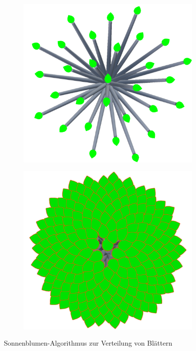 \setlength{\fwidth}{.49\textwidth}
\begin{figure}[htb]
  \centering
  \begin{subfigure}[b]{\fwidth}
   \includegraphics[width=\textwidth]{figures/sunflower-30_2}
    \label{fig:sunflower-30}
  \end{subfigure}
  \hfill
  \begin{subfigure}[b]{\fwidth}
  	\includegraphics[width=\textwidth]{figures/sunflower-200}
  	 \label{fig:sunflower-200}
  \end{subfigure}
  \caption{Sonnenblumen-Algorithmus zur Verteilung von Blättern} \label{fig:sunflower-algorithm}
\end{figure}

